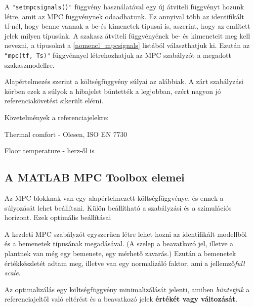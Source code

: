 
A \verb|"setmpcsignals()"| függvény használatával egy új átviteli függvényt hozunk létre, amit az MPC függvénynek odaadhatunk. Ez annyival több az identifikált tf-nél, hogy benne vannak a be-és kimenetek típusai is, aszerint, hogy az említett jelek milyen típusúak. A szakasz átviteli függvényének be- és kimeneteit meg kell nevezni, a típusokat a \ref{nomencl_mpcsignals} listából választhatjuk ki. Ezután az \verb|"mpc(tf, Ts)"| függvénnyel létrehozhatjuk az MPC szabályzót a megadott szakaszmodellre.

Alapértelmezés szerint a költségfüggvény súlyai az alábbiak. A zárt szabályzási körben ezek a súlyok a hibajelet büntették a legjobban, ezért nagyon jó referenciakövetést sikerült elérni.


Követelmények a referenciajelekre:

Thermal comfort - Olesen, ISO EN 7730

Floor temperature - herz-ől is







\subsection{A MATLAB MPC Toolbox elemei}
Az MPC blokknak van egy alapértelmezett költségfüggvénye, és ennek a súlyozását lehet beállítani.
Külön beállítható a szabályzási és a szimulációs horizont.
Ezek optimális beállításai 

A kezdeti MPC szabályzót egyszerűen létre lehet hozni az identifikált modellből és a bemenetek típusának megadásával. (A szelep a beavatkozó jel, illetve a plantnek van még egy bemenete, egy mérhető zavarás.) Ezután a bemenetek értékkészletét adtam meg, illetve van egy normalizáló faktor, ami a jellemző\textit{full scale}.

Az optimalizálás egy költségfüggvény minimalizálását jelenti, amiben \textit{büntetjük} a referenciajeltől való eltérést és a beavatkozó jelek \textbf{értékét vagy változását}.

